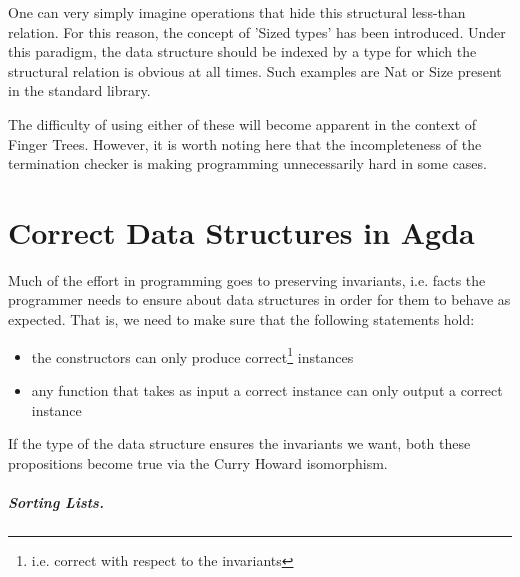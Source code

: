 \documentclass[12pt,twoside,notitlepage]{report}
\begin{document}
One can very simply imagine operations that hide this structural less-than relation. For this reason, the concept of 'Sized types' has been introduced. Under this paradigm, the data structure should be indexed by a type for which the structural relation is obvious at all times. Such examples are Nat or Size present in the standard library. 

The difficulty of using either of these will become apparent in the context of Finger Trees. However, it is worth noting here that the incompleteness \cite{adam_chipala}  of the termination checker is making programming unnecessarily hard in some cases. 

\section{Correct Data Structures in Agda}

Much of the effort in programming goes to preserving invariants, i.e. facts the programmer needs to ensure about data structures in order for them to behave as expected. 
That is, we need to make sure that the following statements hold:
\begin{itemize}
\item the constructors can only produce correct\footnote{i.e. correct with respect to the invariants} instances
\item any function that takes as input a correct instance can only output a correct instance
\end{itemize}

If the type of the data structure ensures the invariants we want, both these propositions become true via the Curry Howard isomorphism.

\subparagraph{Sorting Lists.}
\end{document}
